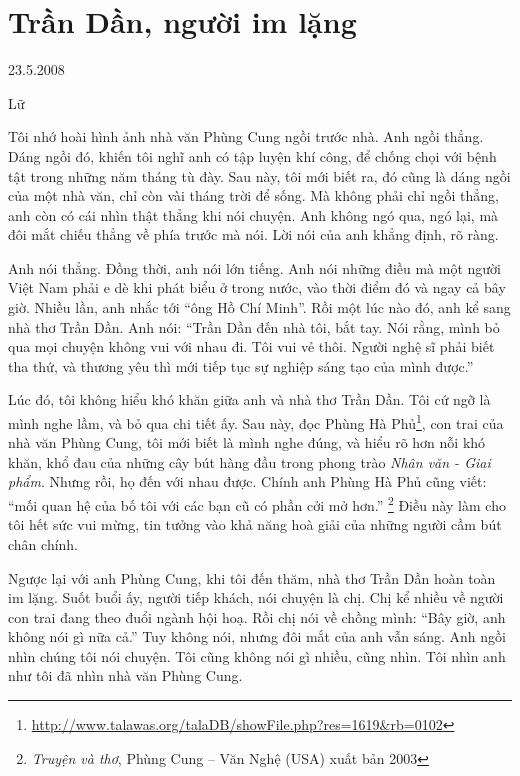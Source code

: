 \documentclass[../main.tex]{subfiles}
\begin{document}
\chapter{Trần Dần, người im lặng}

\begin{metadata}

\begin{flushright}23.5.2008\end{flushright}

 Lữ



\end{metadata}

\begin{multicols}{2}

Tôi nhớ hoài hình ảnh nhà văn Phùng Cung ngồi trước nhà. Anh ngồi thẳng. Dáng ngồi đó, khiến tôi nghĩ anh có tập luyện khí công, để chống chọi với bệnh tật trong những năm tháng tù đày. Sau này, tôi mới biết ra, đó cũng là dáng ngồi của một nhà văn, chỉ còn vài tháng trời để sống. Mà không phải chỉ ngồi thẳng, anh còn có cái nhìn thật thẳng khi nói chuyện. Anh không ngó qua, ngó lại, mà đôi mắt chiếu thẳng về phía trước mà nói. Lời nói của anh khẳng định, rõ ràng. 
 
Anh nói thẳng. Đồng thời, anh nói lớn tiếng. Anh nói những điều mà một người Việt Nam phải e dè khi phát biểu ở trong nước, vào thời điểm đó và ngay cả bây giờ. Nhiều lần, anh nhắc tới “ông Hồ Chí Minh”. Rồi một lúc nào đó, anh kể sang nhà thơ Trần Dần. Anh nói: “Trần Dần đến nhà tôi, bắt tay. Nói rằng, mình bỏ qua mọi chuyện không vui với nhau đi. Tôi vui vẻ thôi. Người nghệ sĩ phải biết tha thứ, và thương yêu thì mới tiếp tục sự nghiệp sáng tạo của mình được.” 
 
Lúc đó, tôi không hiểu khó khăn giữa anh và nhà thơ Trần Dần. Tôi cứ ngỡ là mình nghe lầm, và bỏ qua chi tiết ấy. Sau này, đọc Phùng Hà Phủ\footnote{\url{http://www.talawas.org/talaDB/showFile.php?res=1619&rb=0102}}, con trai của nhà văn Phùng Cung, tôi mới biết là mình nghe đúng, và hiểu rõ hơn nỗi khó khăn, khổ đau của những cây bút hàng đầu trong phong trào \textit{Nhân văn - Giai phẩm}. Nhưng rồi, họ đến với nhau được. Chính anh Phùng Hà Phủ cũng viết: “mối quan hệ của bố tôi với các bạn cũ có phần cởi mở hơn.” \footnote{
\textit{Truyện và thơ}, Phùng Cung – Văn Nghệ (USA) xuất bản 2003}  Điều này làm cho tôi hết sức vui mừng, tin tưởng vào khả năng hoà giải của những người cầm bút chân chính. 
 
Ngược lại với anh Phùng Cung, khi tôi đến thăm, nhà thơ Trần Dần hoàn toàn im lặng. Suốt buổi ấy, người tiếp khách, nói chuyện là chị. Chị kể nhiều về người con trai đang theo đuổi ngành hội hoạ. Rồi chị nói về chồng mình: “Bây giờ, anh không nói gì nữa cả.” Tuy không nói, nhưng đôi mắt của anh vẫn sáng. Anh ngồi nhìn chúng tôi nói chuyện. Tôi cũng không nói gì nhiều, cũng nhìn. Tôi nhìn anh như tôi đã nhìn nhà văn Phùng Cung. 
 

\end{multicols}
\end{document}
